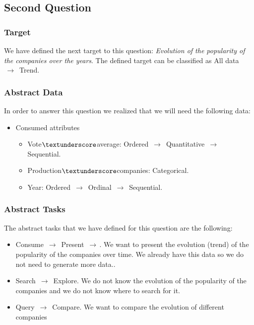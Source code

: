 \subsection{Second Question}

\subsubsection{Target}
We have defined the next target to this question: \textit{Evolution of the popularity of the companies over the years}. The defined target can be classified as All data $\,\to\,$ Trend.

\subsubsection{Abstract Data}

In order to answer this question we realized that we will need the following data:

\begin{itemize}
	\item Consumed attributes
		\begin{itemize}
			\item Vote$\textunderscore$average: Ordered $\,\to\,$ Quantitative $\,\to\,$ Sequential.
			\item Production$\textunderscore$companies: Categorical.
			\item Year: Ordered $\,\to\,$ Ordinal $\,\to\,$ Sequential.
		\end{itemize}
\end{itemize}

\subsubsection{Abstract Tasks}

The abstract tasks that we have defined for this question are the following:

\begin{itemize}
	\item Consume $\,\to\,$ Present $\,\to\,$. We want to present the evolution (trend) of the popularity of the companies over time. We already have this data so we do not need to generate more data..
	\item Search $\,\to\,$ Explore. We do not know the evolution of the popularity of the companies and we do not know where to search for it.
	\item Query $\,\to\,$ Compare. We want to compare the evolution of different companies
\end{itemize}


